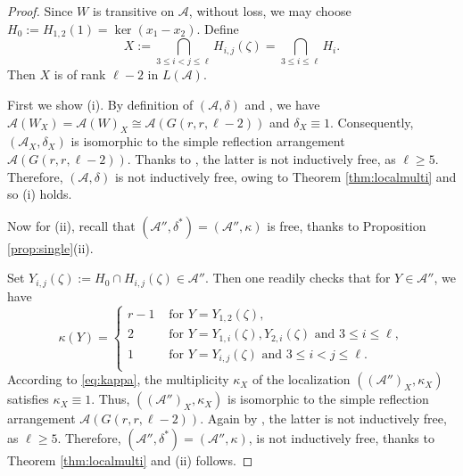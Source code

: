 \begin{proof}
Since $W$ is transitive on ${{\mathcal A}}$, without loss, we may choose
$H_0 := H_{1,2}(1) = \ker(x_1 - x_2)$.
Define 
\[
X := \bigcap_{3 \le i < j \le \ell}{H_{i,j}(\zeta)}
= \bigcap_{3 \le i \le \ell} H_i.
\]
Then $X$ is of rank $\ell-2$ in $L({{\mathcal A}})$.

First we show (i). 
By definition of $({{\mathcal A}}, \delta)$ and 
\cite[Cor.\ 6.28]{orlikterao:arrangements},
we have
${{\mathcal A}}(W_X) = {{\mathcal A}}(W)_X \cong {{\mathcal A}}(G(r,r,\ell-2))$ and 
$\delta_X \equiv 1$.
Consequently, $\left( {{\mathcal A}}_X, \delta_X\right)$ 
is isomorphic to the simple reflection arrangement
${{\mathcal A}}(G(r,r,\ell-2))$.
Thanks to \cite[Prop.\ 3.2]{hogeroehrle:indfree}, 
the latter is not inductively free, as $\ell \ge 5$.
Therefore, $({{\mathcal A}}, \delta)$
is not inductively free, 
owing to Theorem \ref{thm:localmulti} and so (i) holds.

Now for (ii), recall that
$({{\mathcal A}}'', \delta^*) =  ({{\mathcal A}}'', \kappa)$ is free, 
thanks to Proposition \ref{prop:single}(ii).

Set $Y_{i,j}(\zeta) := H_0 \cap H_{i,j}(\zeta) \in {{\mathcal A}}''$.
Then one readily checks that for $Y \in {{\mathcal A}}''$, we have
\begin{equation}
\label{eq:kappa}
\kappa(Y) = 
\begin{cases}
r-1 & \text{ for } Y = Y_{1,2}(\zeta),\\
2   & \text{ for } Y = Y_{1,i}(\zeta), Y_{2,i}(\zeta) \text{ and } 3 \le i \le \ell, \\
1   & \text{ for } Y = Y_{i,j}(\zeta) \text{ and }  3 \le i < j \le \ell.\\
\end{cases}
\end{equation}
According to \eqref{eq:kappa}, the multiplicity 
$\kappa_X$ of the localization  
$\left( ({{\mathcal A}}'')_X, \kappa_X\right)$ satisfies $\kappa_X \equiv 1$.
Thus, $\left( ({{\mathcal A}}'')_X, \kappa_X\right)$ 
is isomorphic to the simple reflection arrangement
${{\mathcal A}}(G(r,r,\ell-2))$.
Again by \cite[Prop.\ 3.2]{hogeroehrle:indfree}, 
the latter is not inductively free, as $\ell \ge 5$.
Therefore, 
$({{\mathcal A}}'', \delta^*) = ({{\mathcal A}}'', \kappa)$,
is not inductively free, 
thanks to Theorem \ref{thm:localmulti} and (ii) follows.
\end{proof}

